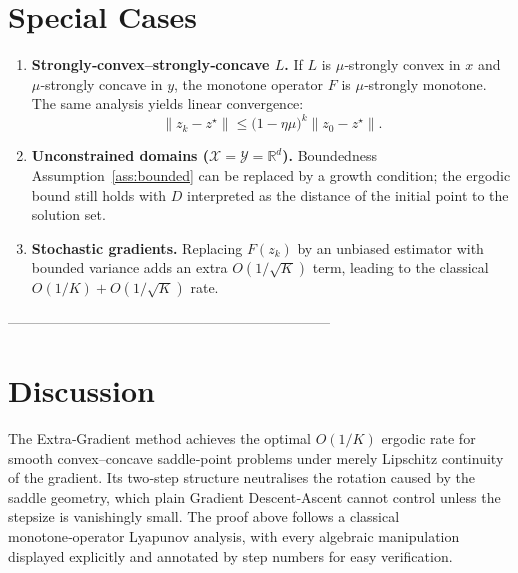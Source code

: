 \documentclass{article}
\newcommand{\R}{\mathbb{R}}
\begin{document}
\section*{Special Cases}
\begin{enumerate}[label={\arabic*.}]
\item \textbf{Strongly‑convex–strongly‑concave $L$.}  
   If $L$ is $\mu$‑strongly convex in $x$ and $\mu$‑strongly concave in $y$, the monotone operator $F$ is $\mu$‑strongly monotone. The same analysis yields linear convergence:
   \[
   \|z_{k}-z^\star\|\le\bigl(1-\eta\mu\bigr)^{k}\|z_{0}-z^\star\|.
   \]
\item \textbf{Unconstrained domains ($\mathcal X=\mathcal Y=\R^{d}$).}  
   Boundedness Assumption~\ref{ass:bounded} can be replaced by a growth condition; the ergodic bound still holds with $D$ interpreted as the distance of the initial point to the solution set.
\item \textbf{Stochastic gradients.}  
   Replacing $F(z_k)$ by an unbiased estimator with bounded variance adds an extra $O(1/\sqrt{K})$ term, leading to the classical $O(1/K)+O(1/\sqrt{K})$ rate.
\end{enumerate}

---------------------------------------------------------------------

\section*{Discussion}
The Extra‑Gradient method achieves the optimal $O(1/K)$ ergodic rate for smooth convex–concave saddle‑point problems under merely Lipschitz continuity of the gradient. Its two‑step structure neutralises the rotation caused by the saddle geometry, which plain Gradient Descent‑Ascent cannot control unless the stepsize is vanishingly small. The proof above follows a classical monotone‑operator Lyapunov analysis, with every algebraic manipulation displayed explicitly and annotated by step numbers for easy verification.
\end{document}
